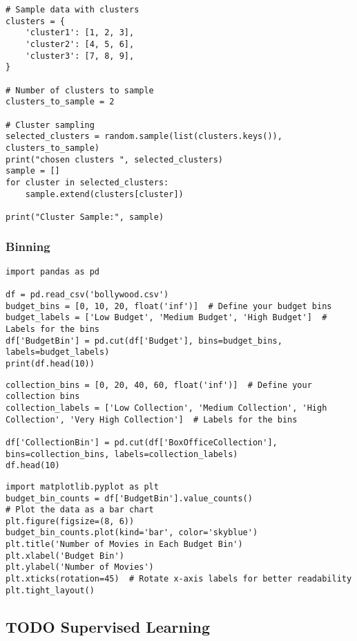 \documentclass[11pt]{article}
\begin{document}
\begin{enumerate}
\begin{verbatim}
# Sample data with clusters
clusters = {
    'cluster1': [1, 2, 3],
    'cluster2': [4, 5, 6],
    'cluster3': [7, 8, 9],
}

# Number of clusters to sample
clusters_to_sample = 2

# Cluster sampling
selected_clusters = random.sample(list(clusters.keys()), clusters_to_sample)
print("chosen clusters ", selected_clusters)
sample = []
for cluster in selected_clusters:
    sample.extend(clusters[cluster])

print("Cluster Sample:", sample)
\end{verbatim}
\end{enumerate}
\subsubsection{Binning}
\label{sec:orga06653f}
\begin{verbatim}
import pandas as pd

df = pd.read_csv('bollywood.csv')
budget_bins = [0, 10, 20, float('inf')]  # Define your budget bins
budget_labels = ['Low Budget', 'Medium Budget', 'High Budget']  # Labels for the bins
df['BudgetBin'] = pd.cut(df['Budget'], bins=budget_bins, labels=budget_labels)
print(df.head(10))
\end{verbatim}

\begin{verbatim}
collection_bins = [0, 20, 40, 60, float('inf')]  # Define your collection bins
collection_labels = ['Low Collection', 'Medium Collection', 'High Collection', 'Very High Collection']  # Labels for the bins

df['CollectionBin'] = pd.cut(df['BoxOfficeCollection'], bins=collection_bins, labels=collection_labels)
df.head(10)
\end{verbatim}

\begin{verbatim}
import matplotlib.pyplot as plt
budget_bin_counts = df['BudgetBin'].value_counts()
# Plot the data as a bar chart
plt.figure(figsize=(8, 6))
budget_bin_counts.plot(kind='bar', color='skyblue')
plt.title('Number of Movies in Each Budget Bin')
plt.xlabel('Budget Bin')
plt.ylabel('Number of Movies')
plt.xticks(rotation=45)  # Rotate x-axis labels for better readability
plt.tight_layout()
\end{verbatim}
\subsection{{\bfseries\sffamily TODO} Supervised Learning}
\label{sec:orgf7a6c4f}
\end{document}
